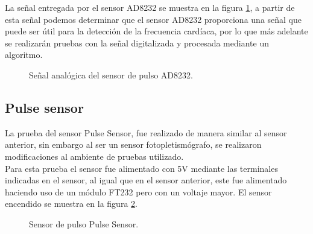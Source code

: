La señal entregada por el sensor AD8232 se muestra en la figura \ref{fig:AD8232Osciloscopio}, a partir de esta señal podemos determinar que el sensor AD8232 proporciona una señal que puede ser útil para la detección de la frecuencia cardíaca, por lo que más adelante se realizarán pruebas con la señal digitalizada y procesada mediante un algoritmo.
\begin{figure}[htbp!]
	\centering
	\caption{Señal analógica del sensor de pulso AD8232.}
	\label{fig:AD8232Osciloscopio}
\end{figure}

\pagebreak

\subsection{Pulse sensor}
La prueba del sensor Pulse Sensor, fue realizado de manera similar al sensor anterior, sin embargo al ser un sensor fotopletismógrafo, se realizaron modificaciones al ambiente de pruebas utilizado.\\

Para esta prueba el sensor fue alimentado con 5V mediante las terminales indicadas en el sensor, al igual que en el sensor anterior, este fue alimentado haciendo uso de un módulo FT232 pero con un voltaje mayor. El sensor encendido se muestra en la figura \ref{fig:PulseSensor2}.\\

	\begin{figure}[htbp!]
		\centering
		\caption{Sensor de pulso Pulse Sensor.}
		\label{fig:PulseSensor2}
	\end{figure}
	
